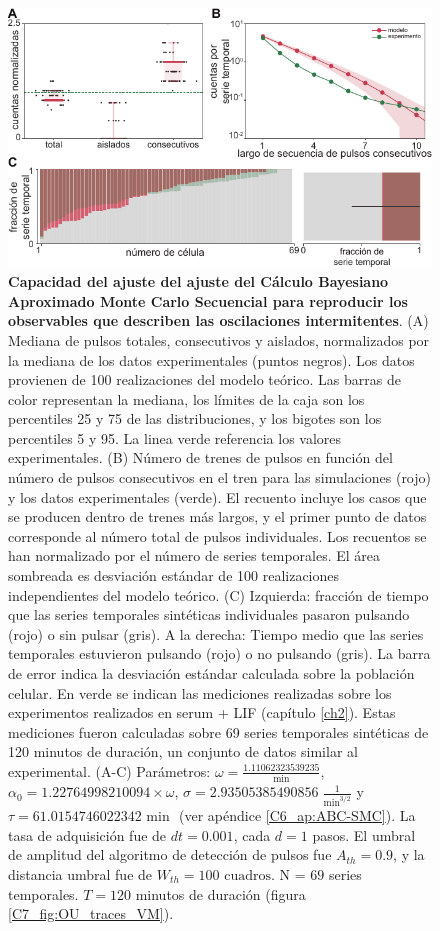 \documentclass[./main.tex]{subfiles}
\begin{document}
\begin{figure}
    \centering
    \includegraphics[width=1\columnwidth]{figures/chapter7/C7_OU_validation.pdf} 
    \caption{\textbf{Capacidad del ajuste del ajuste del Cálculo Bayesiano Aproximado Monte Carlo Secuencial para reproducir los observables que describen las oscilaciones intermitentes}. (A)  Mediana de pulsos totales, consecutivos y aislados, normalizados por la mediana de los datos experimentales (puntos negros). Los datos provienen de 100 realizaciones del modelo teórico. Las barras de color representan la mediana, los límites de la caja son los percentiles 25 y 75 de las distribuciones, y los bigotes son los percentiles 5 y 95. La linea verde referencia los valores experimentales. (B) Número de trenes de pulsos en función del número de pulsos consecutivos en el tren para las simulaciones (rojo) y los datos experimentales (verde). El recuento incluye los casos que se producen dentro de trenes más largos, y el primer punto de datos corresponde al número total de pulsos individuales. Los recuentos se han normalizado por el número de series temporales. El área sombreada es desviación estándar de 100 realizaciones independientes del modelo teórico. (C) Izquierda: fracción de tiempo que las series temporales sintéticas individuales pasaron pulsando (rojo) o sin pulsar (gris). A la derecha: Tiempo medio que las series temporales estuvieron pulsando (rojo) o no pulsando (gris). La barra de error indica la desviación estándar calculada sobre la población celular. En verde se indican las mediciones realizadas sobre los experimentos realizados en serum + LIF (capítulo \ref{ch2}). Estas mediciones fueron calculadas sobre 69 series temporales sintéticas de 120 minutos de duración, un conjunto de datos similar al experimental. (A-C) Parámetros: $\omega = \frac{1.11062323539235}{\text{ min }}$, $\alpha_0 = 1.22764998210094 \times \omega$, $ \sigma = 2.93505385490856 \; \frac{1}{\text{min}^{3/2}}$ y $\tau = 61.0154746022342 \text{ min } $ (ver apéndice \ref{C6_ap:ABC-SMC}). La tasa de adquisición fue de $dt = 0.001$, cada $d = 1$ pasos. El umbral de amplitud del algoritmo de detección de pulsos fue $A_{th} = 0.9$, y la distancia umbral fue de $W_{th} = 100\text{ cuadros}$. N = $69$ series temporales. $T = 120$ minutos de duración (figura \ref{C7_fig:OU_traces_VM}).}
    \label{C7_fig:OU_param_evaluation}
\end{figure} 
\end{document}
